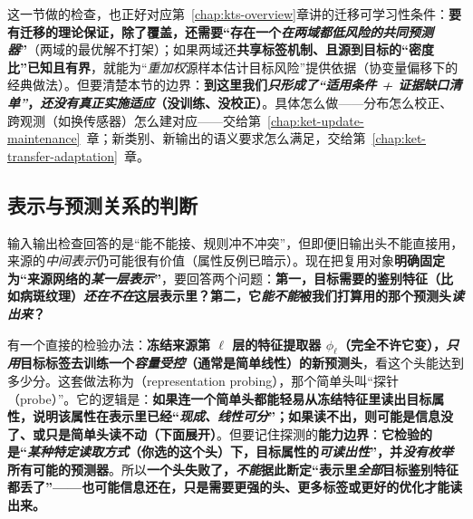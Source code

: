 这一节做的检查，也正好对应第~\ref{chap:kts-overview}章讲的迁移可学习性条件：\textbf{要有迁移的理论保证，除了覆盖，还需要“存在一个\emph{在两域都低风险的共同预测器}”}（两域的最优解不打架）；如果两域还\textbf{共享标签机制、且源到目标的“密度比”已知且有界}，就能为“\emph{重加权}源样本估计目标风险”提供依据（协变量偏移下的经典做法）。但要清楚本节的边界：\textbf{到这里我们\emph{只形成了“适用条件 + 证据缺口清单”}，\emph{还没有真正实施适应}（没训练、没校正）}。具体怎么做——分布怎么校正、跨观测（如换传感器）怎么建对应——交给第~\ref{chap:ket-update-maintenance}~章；新类别、新输出的语义要求怎么满足，交给第~\ref{chap:ket-transfer-adaptation}~章。

\subsection{表示与预测关系的判断}
\label{sec:ket-reuse-representation}

输入输出检查回答的是“能不能接、规则冲不冲突”，但即便旧输出头不能直接用，来源的\emph{中间表示}仍可能很有价值（属性反例已暗示）。现在把复用对象\textbf{明确固定为“来源网络的\emph{某一层表示}”}，要回答两个问题：\textbf{第一，目标需要的鉴别特征（比如病斑纹理）\emph{还在不在}这层表示里？第二，它\emph{能不能}被我们打算用的那个预测头\emph{读出来}？}

有一个直接的检验办法：\textbf{冻结来源第 $\ell$ 层的特征提取器 $\phi_\ell$（完全不许它变），\emph{只用}目标标签去训练一个\emph{容量受控}（通常是简单线性）的新预测头}，看这个头能达到多少分。这套做法称为（representation probing），那个简单头叫“探针（probe）”。它的逻辑是：\textbf{如果连一个简单头都能轻易从冻结特征里读出目标属性，说明该属性在表示里已经“\emph{现成、线性可分}”；如果读不出，则可能是信息没了、或只是简单头读不动（下面展开）}。但要记住探测的\textbf{能力边界}：\textbf{它检验的是“\emph{某种特定读取方式}（你选的这个头）下，目标属性的\emph{可读出性}”，并\emph{没有枚举}所有可能的预测器}。所以\textbf{\textbf{一个头失败了，\emph{不能}据此断定“表示里\emph{全部}目标鉴别特征都丢了}”——也可能信息还在，只是需要更强的头、更多标签或更好的优化才能读出来。}

